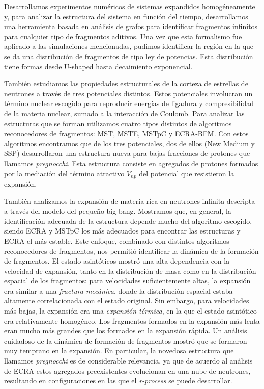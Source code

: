 Desarrollamos experimentos numéricos de sistemas expandidos homogéneamente y, para analizar la estructura del sistema en función del tiempo, desarrollamos una herramienta basada en análisis de grafos para identificar fragmentos infinitos para cualquier tipo de fragmentos aditivos.
Una vez que esta formalismo fue aplicado a las simulaciones mencionadas, pudimos identificar la región en la que se da una distribución de fragmentos de tipo ley de potencias.
Esta distribución tiene formas desde U-shaped hasta decaimiento exponencial.

También estudiamos las propiedades estructurales de la corteza de estrellas de neutrones a través de tres potenciales distintos.
Estos potenciales involucran un término nuclear escogido para reproducir energías de ligadura y compresibilidad de la materia nuclear, sumado a la interacción de Coulomb.
Para analizar las estructuras que se forman utilizamos cuatro tipos distintos de algoritmos reconocedores de fragmentos: MST, MSTE, MSTpC y ECRA-BFM.
Con estos algoritmos encontramos que de los tres potenciales, dos de ellos (New Medium y SSP) desarrollaron una estructura nueva para bajas fracciones de protones que llamamos \emph{pregnocchi}.
Esta estructura consiste en agregados de protones formados por la mediación del término atractivo $V_{np}$ del potencial que resistieron la expansión.

También analizamos la expansión de materia rica en neutrones infinita descripta a través del modelo del pequeño big bang.
Mostramos que, en general, la identificación adecuada de la estructura depende mucho del algoritmo escogido, siendo ECRA y MSTpC los más adecuados para encontrar las estructuras y ECRA el más estable.
Este enfoque, combinado con distintos algoritmos reconocedores de fragmentos, nos permitió identificar la dinámica de la formación de fragmentos.
El estado asintóticos mostró una alta dependencia con la velocidad de expansión, tanto en la distribución de masa como en la distribución espacial de los fragmentos: para velocidades suficientemente altas, la expansión era similar a una \emph{fractura mecánica}, donde la distribución espacial estaba altamente correlacionada con el estado original.
Sin embargo, para velocidades más bajas, la expansión era una \emph{expansión térmica}, en la que el estado asintótico era relativamente homogéneo.
Los fragmentos formados en la expansión más lenta eran mucho más grandes que los formados en la expansión rápida.
Un análisis cuidadoso de la dinámica de formación de fragmentos mostró que se formaron muy temprano en la expansión.
En particular, la novedosa estructura que llamamos \emph{pregnocchi} es de considerable relevancia, ya que de acuerdo al análisis de ECRA estos agregados preexistentes evolucionan en una nube de neutrones, resultando en configuraciones en las que el \emph{r-process} se puede desarrollar.
